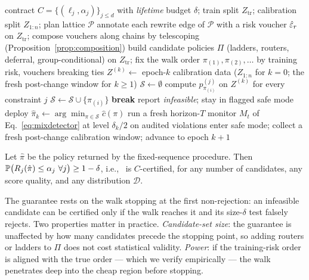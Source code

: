 \begin{algorithm}[t]
\caption{Certified lifetime deployment of a RAG knowledge service}
\label{alg:certify}
\begin{algorithmic}[1]
\REQUIRE contract $C = \{(\ell_j, \alpha_j)\}_{j \le d}$ with
\emph{lifetime} budget $\delta$; train split $Z_{\mathrm{tr}}$;
calibration split $Z_{1:n}$; plan lattice $\mathcal{P}$
\STATE annotate each rewrite edge of $\mathcal{P}$ with a risk voucher
$\hat{\varepsilon}_r$ on $Z_{\mathrm{tr}}$; compose vouchers along chains by
telescoping (Proposition~\ref{prop:composition})
\STATE build candidate policies $\Pi$ (ladders, routers, deferral,
group-conditional) on $Z_{\mathrm{tr}}$; fix the walk order
$\pi_{(1)}, \pi_{(2)}, \dots$ by training risk, vouchers breaking ties
  \STATE $Z^{(k)} \leftarrow$ epoch-$k$ calibration data ($Z_{1:n}$
  for $k = 0$; the fresh post-change window for $k \ge 1$)
  \STATE $\mathcal{S} \leftarrow \emptyset$ 
    \STATE compute $p^{(j)}_{\pi_{(i)}}$ on $Z^{(k)}$ for every
    constraint $j$
      \STATE $\mathcal{S} \leftarrow \mathcal{S} \cup \{\pi_{(i)}\}$
    \ELSE
      \STATE \textbf{break} 
    \ENDIF
  \ENDFOR
    \STATE report \emph{infeasible}; stay in flagged safe mode
  \ELSE
    \STATE deploy $\hat\pi_k \leftarrow \arg\min_{\pi \in \mathcal{S}}
    \hat c(\pi)$
  \ENDIF
  \STATE run a fresh horizon-$T$ monitor $M_t$ of
  Eq.~\eqref{eq:mixdetector} at level $\delta_k/2$ on audited
  violations
    \STATE enter safe mode; collect a fresh post-change calibration
    window; advance to epoch $k+1$
  \ENDIF
\ENDFOR
\end{algorithmic}
\end{algorithm}

\begin{theorem}
\label{thm:validity}
Let $\hat\pi$ be the policy returned by the fixed-sequence procedure.
Then $\mathbb{P}\big(R_j(\hat\pi) \le \alpha_j \ \forall j\big) \ge
1-\delta$, i.e., \system\ is $C$-certified, for any number of
candidates, any score quality, and any distribution $\mathcal{D}$.
\end{theorem}

The guarantee rests on the walk stopping at the first non-rejection:
an infeasible candidate can be certified only if the
walk reaches it and its size-$\delta$ test falsely rejects. Two
properties matter in practice. \emph{Candidate-set size}: the
guarantee is unaffected by how many candidates precede the stopping
point, so adding routers or ladders to $\Pi$ does not cost statistical
validity. \emph{Power}: if the training-risk order is
aligned with the true order --- which we verify empirically --- the
walk penetrates deep into the cheap region before stopping.

